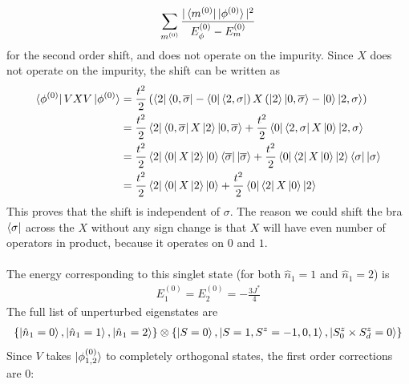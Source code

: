 \documentclass[twoside]{report}
\numberwithin{equation}{section}
\begin{document}
\begin{equation}\begin{aligned}
	\sum_{m^{(0)}}\frac{|\bra{m^{(0)}}\ket{\phi^{(0)}}|^2}{E^{(0)}_\phi - E^{(0)}_m}
\end{aligned}\end{equation}
for the second order shift, and does not operate on the impurity. Since \(X\) does not operate on the impurity, the shift can be written as
\begin{equation}\begin{aligned}
	\bra{\phi^{(0)}} V X V \ket{\phi^{(0)}} &= \frac{t^2}{2}\left(\bra{2}\bra{0,\overline\sigma} - \bra{0}\bra{2,\sigma}\right)X\left(\ket{2}\ket{0,\overline\sigma} - \ket{0}\ket{2,\sigma}\right)\\
		 &= \frac{t^2}{2}\bra{2}\bra{0,\overline\sigma} X\ket{2}\ket{0,\overline\sigma} + \frac{t^2}{2}\bra{0}\bra{2,\sigma}X \ket{0}\ket{2,\sigma}\\
		 &= \frac{t^2}{2}\bra{2}\bra{0} X\ket{2}\ket{0}\bra{\overline\sigma}\ket{\overline\sigma} + \frac{t^2}{2}\bra{0}\bra{2}X \ket{0}\ket{2}\bra{\sigma}\ket{\sigma}\\
		 &= \frac{t^2}{2}\bra{2}\bra{0} X\ket{2}\ket{0} + \frac{t^2}{2}\bra{0}\bra{2}X \ket{0}\ket{2}
\end{aligned}\end{equation}
This proves that the shift is independent of \(\sigma\). The reason we could shift the bra \(\bra{\sigma}\) across the \(X\) without any sign change is that \(X\) will have even number of operators in product, because it operates on \(0\) and \(1\).
\\\\The energy corresponding to this singlet state (for both \(\hat n_1=1\) and \(\hat n_1=2\)) is
\begin{equation}\begin{aligned}
	E_1^{(0)} = E_2^{(0)} = -\frac{3J^*}{4}
\end{aligned}\end{equation}
The full list of unperturbed eigenstates are 
\begin{equation}\begin{aligned}
	\left\{\ket{\hat n_1 = 0}, \ket{\hat n_1=1}, \ket{\hat n_1 = 2}\right\} \otimes \left\{ \ket{S=0}, \ket{S=1, S^z=-1,0,1}, \ket{S_0^z \times S_d^z = 0}\right\} 
\end{aligned}\end{equation}
Since \(V\) takes \(\ket{\phi_{1,2}^{(0)}}\) to completely orthogonal states, the first order corrections are 0:
\end{document}
